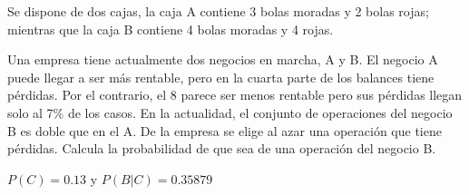 \documentclass[addpoints,spanish, 12pt,a4paper]{exam}
\begin{document}
\begin{questions}


        \question Se dispone de dos cajas, la caja A contiene 3 bolas moradas y 2 bolas rojas; mientras que la caja B contiene 4
    bolas moradas y 4 rojas.
        
        
\question[2] Una empresa tiene actualmente dos negocios en marcha, A y B. El negocio A puede llegar a ser más rentable, pero en la cuarta parte de los balances tiene pérdidas. Por el contrario, el 8 parece ser menos rentable pero sus pérdidas llegan solo al 7\% de los casos. En la actualidad, el conjunto de operaciones del negocio B es doble que en el A. De la empresa se elige al azar una operación que tiene pérdidas. Calcula la probabilidad de que sea de una operación del negocio B. 
\begin{solution}
$P(C)=0.13$ y $P(B|C)=0.35879$
\end{solution}


\end{questions}
\end{document}
